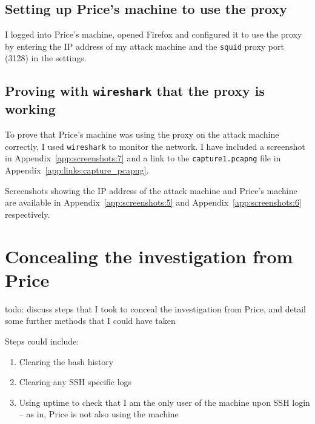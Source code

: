 \documentclass[12pt]{report}
\newcommand{\term}[1]{\colorbox{light-gray}{\texttt{#1}}}
\begin{document}
\subsection*{Setting up Price's machine to use the proxy}
%

I logged into Price's machine, opened Firefox and configured it to use the proxy by entering the IP address of my attack machine and the \texttt{squid} proxy port (3128) in the settings.



\subsection*{Proving with \texttt{wireshark} that the proxy is working}
To prove that Price's machine was using the proxy on the attack machine correctly, I used \texttt{wireshark} to monitor the network. I have included a screenshot in Appendix~\ref{app:screenshots:7} and a link to the \texttt{capture1.pcapng} file in Appendix~\ref{app:links:capture_pcapng}.

Screenshots showing the IP address of the attack machine and Price's machine are available in Appendix~\ref{app:screenshots:5} and Appendix~\ref{app:screenshots:6} respectively.


\section{Concealing the investigation from Price}
todo: discuss steps that I took to conceal the investigation from Price, and detail some further methods that I could have taken

Steps could include:
\begin{enumerate}
  \item Clearing the bash history
  \item Clearing any SSH specific logs
  \item Using uptime to check that I am the only user of the machine upon SSH login -- as in, Price is not also using the machine
\end{enumerate}
\end{document}
